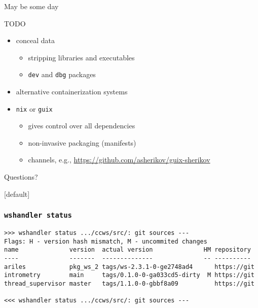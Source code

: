 \documentclass[hyperref={colorlinks=false, breaklinks=true},11pt]{beamer}
\makeatletter
\newenvironment{withoutheadline}{
        \setbeamertemplate{headline}[default]
        \def\beamer@entrycode{\vspace*{-\headheight}}
    }{}
\makeatother
\begin{document}
\begin{frame}{May be some day}
    \begin{block}{TODO}
        \begin{itemize}
            \item conceal data
                \begin{itemize}
                    \item stripping libraries and executables
                    \item \texttt{dev} and \texttt{dbg} packages
                \end{itemize}
            \item alternative containerization systems
            \item \texttt{nix} or \texttt{guix}
                \begin{itemize}
                    \item gives control over all dependencies
                    \item non-invasive packaging (manifests)
                    \item channels, e.g., \url{https://github.com/asherikov/guix-sherikov}
                \end{itemize}
        \end{itemize}
    \end{block}
\end{frame}

\begin{frame}

    \centerline{Questions?}

\end{frame}


\begin{withoutheadline}
\begin{frame}
    \frametitle{\texttt{wshandler status}}
\footnotesize{%
\begin{verbatim}
>>> wshandler status .../ccws/src/: git sources ---
Flags: H - version hash mismatch, M - uncommited changes
name              version  actual version              HM repository
----              -------  --------------              -- ----------
ariles            pkg_ws_2 tags/ws-2.3.1-0-ge2748ad4      https://git
intrometry        main     tags/0.1.0-0-ga033cd5-dirty  M https://git
thread_supervisor master   tags/1.1.0-0-gbbf8a09          https://git

<<< wshandler status .../ccws/src/: git sources ---
\end{verbatim}
}
\end{frame}
\end{withoutheadline}
\end{document}
